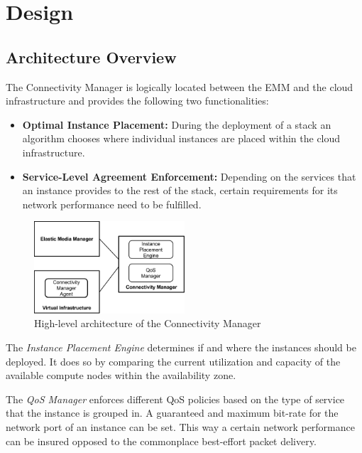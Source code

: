\chapter{Design}

\section{Architecture Overview}

The Connectivity Manager is logically located between the EMM and the cloud infrastructure and provides the following two functionalities:
\begin{itemize}
\item \textbf{Optimal Instance Placement:} During the deployment of a stack an algorithm chooses where individual instances are placed within the cloud infrastructure.
\item \textbf{Service-Level Agreement Enforcement:} Depending on the services that an instance provides to the rest of the stack, certain requirements for its network performance need to be fulfilled.
\end{itemize}

\begin{figure}[H]
\centering

\includegraphics[width=0.5\textwidth]{images/design/functional_architecture}

\caption{High-level architecture of the Connectivity Manager}
\end{figure}

The \textit{Instance Placement Engine} determines if and where the instances should be deployed. It does so by comparing the current utilization and capacity of the available compute nodes within the availability zone.

The \textit{QoS Manager} enforces different QoS policies based on the type of service that the instance is grouped in. A guaranteed and maximum bit-rate for the network port of an instance can be set. This way a certain network performance can be insured opposed to the commonplace best-effort packet delivery.

